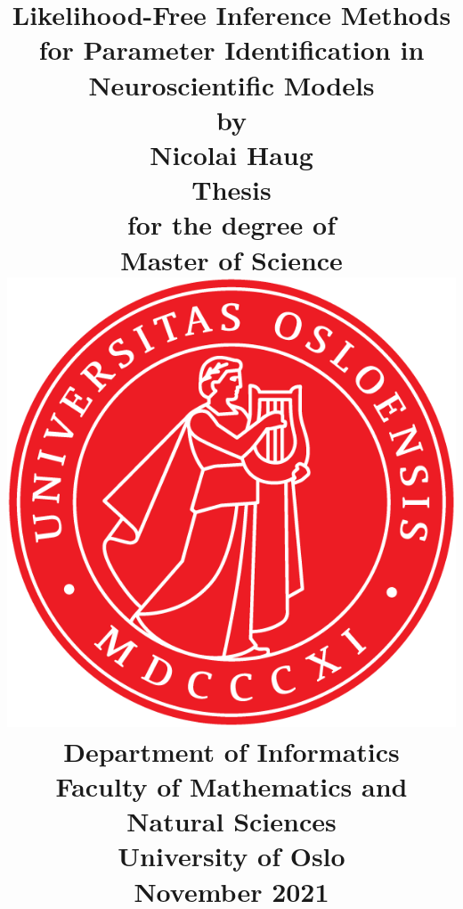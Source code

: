 \title{
    \Large \textbf{Likelihood-Free Inference Methods for Parameter Identification in Neuroscientific Models}
    \\[8 pt]
    \large by
    \\ [8 pt]
    \large Nicolai Haug
    \\ [40 pt]
    \large \textbf{Thesis}
    \\ [8 pt]
    \large for the degree of
    \\ [8 pt]
    \large \textbf{Master of Science}
    \\ [30 pt]
    \includegraphics[scale=0.9]{latex/latex-report/3_Images/Logo/UiO/UiO_Segl_300dpi.png}
    \\ [30 pt]
    \large Department of Informatics
    \\ [8 pt]
    \large Faculty of Mathematics and Natural Sciences
    \\ [8 pt]
    \large University of Oslo
    \\ [15 pt]
    \large November 2021
}%

\author{\vspace{-5ex}}
\date{\vspace{-5ex}}


\maketitle